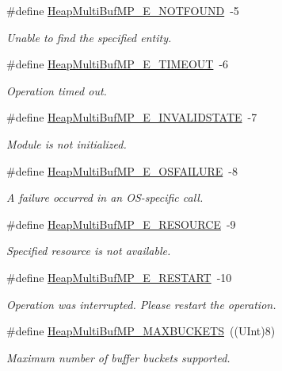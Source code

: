 \begin{DoxyCompactItemize}
\#define \hyperlink{_heap_multi_buf_m_p_8h_a9e65df2b0c5a166d3d38530d191f14d1}{HeapMultiBufMP\_\-E\_\-NOTFOUND}~-\/5
\begin{DoxyCompactList}\small\item\em Unable to find the specified entity. \item\end{DoxyCompactList}\item 
\#define \hyperlink{_heap_multi_buf_m_p_8h_a6ad1a9ffb91f75d79919732c5de78e63}{HeapMultiBufMP\_\-E\_\-TIMEOUT}~-\/6
\begin{DoxyCompactList}\small\item\em Operation timed out. \item\end{DoxyCompactList}\item 
\#define \hyperlink{_heap_multi_buf_m_p_8h_af631aca7140763ec034bd45fdc5f4d73}{HeapMultiBufMP\_\-E\_\-INVALIDSTATE}~-\/7
\begin{DoxyCompactList}\small\item\em Module is not initialized. \item\end{DoxyCompactList}\item 
\#define \hyperlink{_heap_multi_buf_m_p_8h_a72ae1d6fe31a65ae7064197fa66229fc}{HeapMultiBufMP\_\-E\_\-OSFAILURE}~-\/8
\begin{DoxyCompactList}\small\item\em A failure occurred in an OS-\/specific call. \item\end{DoxyCompactList}\item 
\#define \hyperlink{_heap_multi_buf_m_p_8h_a48d5b8e442db63bee46fd6984a321639}{HeapMultiBufMP\_\-E\_\-RESOURCE}~-\/9
\begin{DoxyCompactList}\small\item\em Specified resource is not available. \item\end{DoxyCompactList}\item 
\#define \hyperlink{_heap_multi_buf_m_p_8h_a1bdbda42d7389cd53338729ca3804851}{HeapMultiBufMP\_\-E\_\-RESTART}~-\/10
\begin{DoxyCompactList}\small\item\em Operation was interrupted. Please restart the operation. \item\end{DoxyCompactList}\item 
\#define \hyperlink{_heap_multi_buf_m_p_8h_adf1fa817a6a12132b7293ec1fc1c8bf4}{HeapMultiBufMP\_\-MAXBUCKETS}~((UInt)8)
\begin{DoxyCompactList}\small\item\em Maximum number of buffer buckets supported. \item\end{DoxyCompactList}\end{DoxyCompactItemize}
